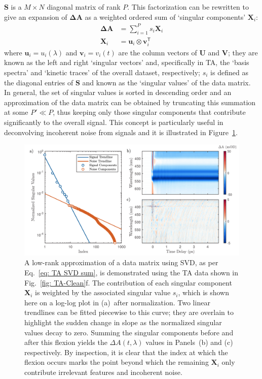 $\mathbf{S}$ is a $M \times N$ diagonal matrix of rank $P$.
This factorization can be rewritten to give an expansion of $\mathbf{\Delta \! A}$
as a weighted ordered sum of `singular components' $\mathbf{X}_i$:
%
\begin{equation}
  \begin{aligned}
    \mathbf{\Delta \! A} & = \sum_{i = 1}^P s_i \mathbf{X}_i \\
    \mathbf{X}_i & = \mathbf{u}_i \otimes \mathbf{v}_i^\mathsf{T}
    \label{eq: TA SVD sum}
  \end{aligned}
\end{equation}
%
where $\mathbf{u}_i = u_i(\lambda)$ and $\mathbf{v}_i = v_i(t)$
are the column vectors of $\mathbf{U}$ and $\mathbf{V}$; they are known as
the left and right `singular vectors' and, specifically in TA, the `basis spectra'
and `kinetic traces' of the overall dataset, respectively; $s_i$ is defined as the diagonal entries of $\mathbf{S}$
and known as the `singular values' of the data matrix.
In general, the set of singular values is sorted in descending order and
an approximation of the data matrix can be obtained by truncating this summation
at some $P' \ll P$, thus keeping only those singular components that contribute
significantly to the overall signal. This concept is particularly useful in
deconvolving incoherent noise from signals and it is illustrated in Figure~\ref{fig: TA-SVD}.

\begin{figure}[t!]
  \centering
  \includegraphics[width = \textwidth]{Figures/fig_TA_svd.pdf}
  \caption[Demonstration of a low-rank approximation of a TA data matrix using SVD.]{
  A low-rank approximation of a data matrix using SVD, as per Eq.~\eqref{eq: TA SVD sum},
  is demonstrated using the TA data shown in Fig.~\ref{fig: TA-Clean}f.
  The contribution of each singular component $\mathbf{X}_i$ is weighted by
  the associated singular value $s_i$,
  which is shown here on a log-log plot in (a)~after normalization.
  Two linear trendlines can be fitted piecewise to this curve; they are overlain
  to highlight the sudden change in slope as the normalized singular values decay to zero.
  Summing the singular components before and after this flexion yields
  the $\Delta A(t, \lambda)$ values in Panels~(b) and (c) respectively.
  By inspection, it is clear that the index at which the flexion occurs marks
  the point beyond which the remaining $\mathbf{X}_i$ only contribute irrelevant features
  and incoherent noise.
  }
  \label{fig: TA-SVD}
\end{figure}

